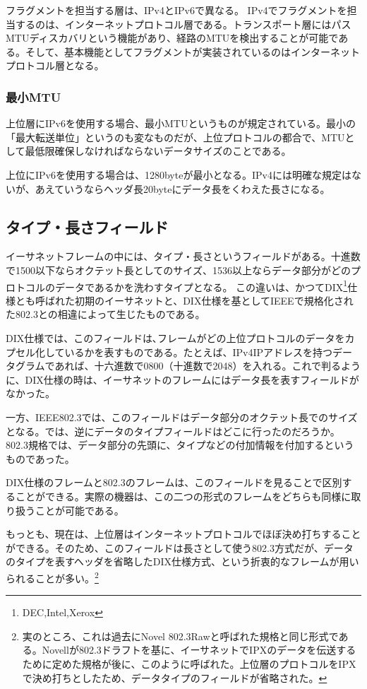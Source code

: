 フラグメントを担当する層は、IPv4とIPv6で異なる。
IPv4でフラグメントを担当するのは、インターネットプロトコル層である。トランスポート層にはパスMTUディスカバリという機能があり、経路のMTUを検出することが可能である。そして、基本機能としてフラグメントが実装されているのはインターネットプロトコル層となる。

\subsubsection{最小MTU}
上位層にIPv6を使用する場合、最小MTUというものが規定されている。最小の「最大転送単位」というのも変なものだが、上位プロトコルの都合で、MTUとして最低限確保しなければならないデータサイズのことである。

上位にIPv6を使用する場合は、1280byteが最小となる。IPv4には明確な規定はないが、あえていうならヘッダ長20byteにデータ長をくわえた長さになる。

\subsection{タイプ・長さフィールド}
イーサネットフレームの中には、タイプ・長さというフィールドがある。十進数で1500以下ならオクテット長としてのサイズ、1536以上ならデータ部分がどのプロトコルのデータであるかを洗わすタイプとなる。
この違いは、かつてDIX\footnote{DEC,Intel,Xerox}仕様とも呼ばれた初期のイーサネットと、DIX仕様を基としてIEEEで規格化された802.3との相違によって生じたものである。

DIX仕様では、このフィールドは､フレームがどの上位プロトコルのデータをカプセル化しているかを表すものである。たとえば、IPv4IPアドレスを持つデータグラムであれば、十六進数で0800（十進数で2048）を入れる。これで判るように、DIX仕様の時は、イーサネットのフレームにはデータ長を表すフィールドがなかった。

一方、IEEE802.3では、このフィールドはデータ部分のオクテット長でのサイズとなる。では、逆にデータのタイプフィールドはどこに行ったのだろうか。802.3規格では、データ部分の先頭に、タイプなどの付加情報を付加するというものであった。

DIX仕様のフレームと802.3のフレームは、このフィールドを見ることで区別することができる。実際の機器は、この二つの形式のフレームをどちらも同様に取り扱うことが可能である。

もっとも、現在は、上位層はインターネットプロトコルでほぼ決め打ちすることができる。そのため、このフィールドは長さとして使う802.3方式だが、データのタイプを表すヘッダを省略したDIX仕様方式、という折衷的なフレームが用いられることが多い。\footnote{実のところ、これは過去にNovel 802.3Rawと呼ばれた規格と同じ形式である。Novellが802.3ドラフトを基に、イーサネットでIPXのデータを伝送するために定めた規格が後に、このように呼ばれた。上位層のプロトコルをIPXで決め打ちとしたため、データタイプのフィールドが省略された。}



